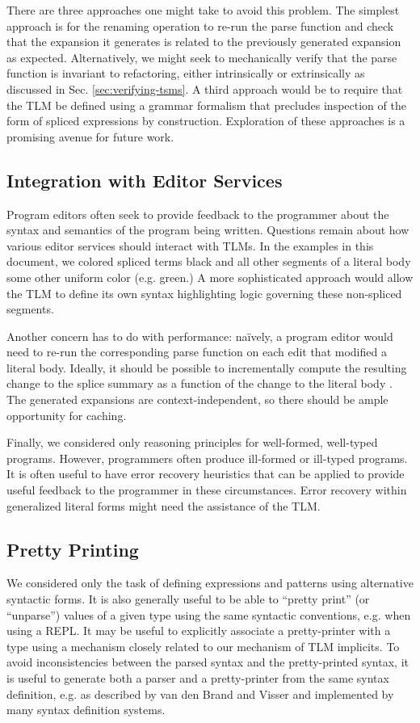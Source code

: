 There are three approaches one might take to avoid this problem. The simplest approach is for the renaming operation to re-run the parse function and check that the expansion it generates is related to the previously generated expansion as expected. Alternatively, we might seek to mechanically verify that the parse function is invariant to refactoring, either intrinsically or extrinsically as discussed in Sec. \ref{sec:verifying-tsms}. 
A third approach would be to require that the TLM be defined using a grammar formalism that precludes inspection of the form of spliced expressions by construction. Exploration of these approaches is a promising avenue for future work.

\subsection{Integration with Editor Services}\label{sec:editor-integration}
Program editors often seek to provide feedback to the programmer about the syntax and semantics of the program being written. Questions remain about how various editor services should interact with TLMs. In the examples in this document, we colored spliced terms black and all other segments of a literal body some other uniform color (e.g. green.) A more sophisticated approach would allow the TLM to define its own syntax highlighting logic governing these non-spliced segments.

Another concern has to do with performance: na\"ively, a program editor would need to re-run the corresponding parse function on each edit that modified a literal body. Ideally, it should be possible to incrementally compute the resulting change to the splice summary as a function of the change to the literal body \cite{Ghezzi:1979:IP:357062.357066}. The generated expansions are context-independent, so there should be ample opportunity for caching.

Finally, we considered only reasoning principles for well-formed, well-typed programs. However, programmers often produce ill-formed or ill-typed programs. It is often useful to have error recovery heuristics that can be applied to provide useful feedback to the programmer in these circumstances. Error recovery within generalized literal forms might need the assistance of the TLM.


\subsection{Pretty Printing}\label{sec:resugaring}
We considered only the task of defining expressions and patterns using alternative syntactic forms. It is also generally useful to be able to ``pretty print'' (or ``unparse'') values of a given type using the same syntactic conventions, e.g. when using a REPL. It may be useful to explicitly associate a pretty-printer with a type using a mechanism closely related to our mechanism of TLM implicits. To avoid inconsistencies between the parsed syntax and the pretty-printed syntax, it is useful to generate both a parser and a pretty-printer from the same syntax definition, e.g. as described by van den Brand and Visser \cite{DBLP:journals/tosem/BrandV96} and implemented by many syntax definition systems. 

